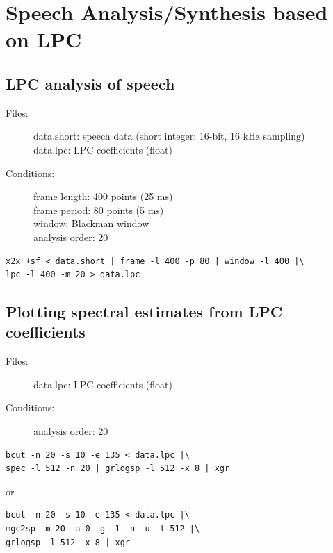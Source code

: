 \documentclass[a4paper,10pt]{article}
\begin{document}
\section{Speech Analysis/Synthesis based on LPC}

\subsection{LPC analysis of speech}

\begin{description}
\item[Files:]
  data.short: speech data (short integer: 16-bit, 16 kHz sampling)\\
  data.lpc: LPC coefficients (float)
\item[Conditions:]
  frame length: 400 points (25 ms)\\
  frame period: 80 points (5 ms)\\
  window: Blackman window\\
  analysis order: 20
\end{description}

\begin{verbatim}
x2x +sf < data.short | frame -l 400 -p 80 | window -l 400 |\
lpc -l 400 -m 20 > data.lpc
\end{verbatim}

\subsection{Plotting spectral estimates from LPC coefficients}

\begin{description}
\item[Files:]
  data.lpc: LPC coefficients (float)
\item[Conditions:]
  analysis order: 20
\end{description}

\begin{verbatim}
bcut -n 20 -s 10 -e 135 < data.lpc |\
spec -l 512 -n 20 | grlogsp -l 512 -x 8 | xgr
\end{verbatim}

or

\begin{verbatim}
bcut -n 20 -s 10 -e 135 < data.lpc |\
mgc2sp -m 20 -a 0 -g -1 -n -u -l 512 |\
grlogsp -l 512 -x 8 | xgr
\end{verbatim}
\end{document}
